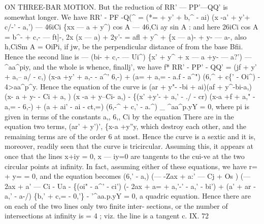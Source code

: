 \documentclass[11pt,a4paper]{book}
\begin{document}
ON THREE-BAR MOTION.
But the reduction
of RR' --- PP'---QQ'
is somewhat
longer.
We have
RR' - PF -Q(\textasciicircum{} = (*\textbullet{}= + y' + b,\textasciicircum{} - ai) (x -a' + y'+
c/-' - a,')
--- 46iCi \{xx --- a + y\textasciicircum{}) cos A --- 46,Ci ay sin A
:
and here
26iCi cos A = b\textasciicircum{}- + c,- --- ft]-,
2x (x --- a) + 2y'- = afl + y\textasciicircum{} + \{x --- a)- + y- --- a-,
also
h,CiSm A = OiPi,
if
jw,
be
the
perpendicular
distance
of
from
the
base
Bfii.
Hence the second
line
is
--- (bi- + c,- --- Ui\textasciicircum{}) \{x' + y\textasciicircum{} + x --- a +y- --- a?') --- \textasciicircum{}aa\textasciicircum{}piy,
and the whole
is
whence,
finallj', we have
f*
RR' - PP' - QQ' = (jf + y' + a,-- a/ - c,\guillemotright{}) (x-a +y' + a,- - a\textasciicircum{}'
6,-)
+ (a= + a,= - a.f - a\textasciicircum{}") (6,\textasciicircum{} + c\{' - Oi\textasciicircum{}) - 4>aa\textasciicircum{}p\textasciicircum{}y.
Hence the equation of the curve
is
(ar + y"- -bi + ai)(af + y\textasciicircum{}-bi-a,)(x- a + y- - Ci + a, ) (x -a + y--Ci- a,)
- \{(x' +y'- + a,' - \guillemotleft{}./ - cr) (x-a +f + a," - a,= - 6,-)
+ (a\guillemotright{} + ai' - ai - ct,=) (6,-\textasciicircum{} + c,' - a.\textasciicircum{}) \_ \textasciicircum{}aa\textasciicircum{}p.yY = 0,
where pi
is given
in terms of the constants
a,,
6,,
Ci by
the equation
There
are
in
the
equation
two
terms,
(ar' + y')', \{x-a +y''y, which
destroy each
other,
and
the
remaining
terms
are
of
the
order
6
at
most.
Hence
the
curve
is
a
sextic
and
it
is,
moreover,
readily
seen
that
the
curve
is
tricircular.
Assuming
this,
it
appears
at
once
that
the
lines x+iy = 0, x --- iy=0
are
tangents
to
the
cui-ve
at the
two
circular
points
at
infinity.
In
fact, assuming
either
of
these
equations,
we
have
r= + y= = 0, and the equation becomes
(6,' - a,\guillemotright{}) (--- -Zax + a:' --- Cj + Os ) (--- 2ax + a' --- Ci - Ua
- \{(oi" - a\textasciicircum{}' - ci') (- 2ax + a= + a,'-' - a,' - bi')
+ (a' + ar - a,' - a-/) \{b,' + c,= - 0,'\} - '\textasciicircum{}aa.p.yY = 0,
a
quadric
equation.
Hence
there
are
on
each
of
the
two
lines
only two
finite
inter-
sections, or
the
number
of
intersections
at
infinity
is = 4 ;
viz.
the
line
is
a
tangent
c. IX.
72
\end{document}
